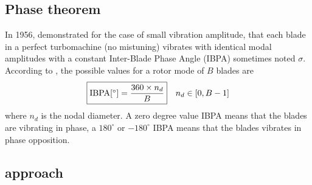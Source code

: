 \subsection{Phase theorem}
\label{sub:lane_theorem}

In 1956, \citet{Lane1956} 
demonstrated for the case of small vibration amplitude,
that each blade in a perfect turbomachine (no mistuning) vibrates with
identical modal amplitudes with a constant Inter-Blade
Phase Angle (IBPA) sometimes noted $\sigma$. 
According to \citet{Lane1956}, the possible values 
for a rotor mode of $B$ blades are
\begin{equation}
    \fbox{$\textrm{IBPA} [^\circ] = \displaystyle \frac{360 \times n_d}{B}$} \quad n_d \in [0, B-1]
\end{equation}
where $n_d$ is the nodal diameter.
A zero degree value IBPA means that the blades are vibrating in phase, a $180^\circ$ or
$-180^\circ$ IBPA means that the blades vibrates in phase opposition.

\subsection{\texorpdfstring{\underline{}}{Decoupled} approach}
\label{sub:weak_coupling_approach}

